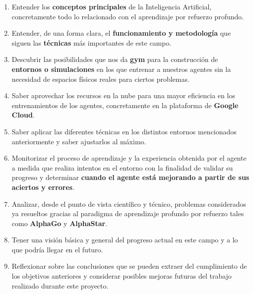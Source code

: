 \documentclass[11pt,fleqn]{book} %
\begin{document}
\begin{enumerate}
	\item Entender los \textbf{conceptos principales} de la Inteligencia Artificial, concretamente todo lo relacionado con el aprendizaje por refuerzo profundo. \\
	
	\item Entender, de una forma clara, el \textbf{funcionamiento y metodología} que siguen las \textbf{técnicas} más importantes de este campo. \\
	
	\item Descubrir las posibilidades que nos da \textbf{gym} \cite{article:gym} para la construcción de \textbf{entornos o simulaciones} en los que entrenar a nuestros agentes sin la necesidad de espacios físicos reales para ciertos problemas. \\
	
	\item Saber aprovechar los recursos en la nube para una mayor eficiencia en los entrenamientos de los agentes, concretamente en la plataforma de \textbf{Google Cloud}. \\
	
	\item Saber aplicar las diferentes técnicas en los distintos entornos mencionados anteriormente y saber ajustarlos al máximo. \\
	
	\item Monitorizar el proceso de aprendizaje y la experiencia obtenida por el agente a medida que realiza intentos en el entorno con la finalidad de validar su progreso y determinar \textbf{cuando el agente está mejorando a partir de sus aciertos y errores}. \\
	
	\item Analizar, desde el punto de vista científico y técnico, problemas considerados ya resueltos gracias al paradigma de aprendizaje profundo por refuerzo tales como \textbf{AlphaGo} y \textbf{AlphaStar}. \\
	
	\item Tener una visión básica y general del progreso actual en este campo y a lo que podría llegar en el futuro. \\
	
	\item Reflexionar sobre las conclusiones que se pueden extraer del cumplimiento de los objetivos anteriores y considerar posibles mejoras futuras del trabajo realizado durante este proyecto.
\end{enumerate}
\end{document}
